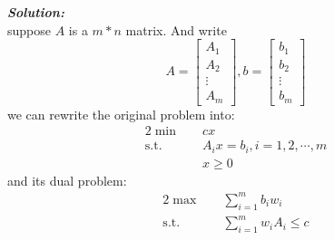 \documentclass[paper=a4, fontsize=11pt]{scrartcl} %
\numberwithin{equation}{section} %
\numberwithin{figure}{section} %
\numberwithin{table}{section} %
\begin{document}
\emph{\textbf{Solution:}}\\
suppose $A$ is a $m*n$ matrix. And write
\begin{equation}\nonumber
A=\begin{bmatrix}
   A_1\\
   A_2\\
   \vdots\\
   A_m
  \end{bmatrix},
b= \begin{bmatrix}
   b_1\\
   b_2\\
   \vdots\\
   b_m
  \end{bmatrix}
\end{equation}
we can rewrite the original problem into:
\begin{alignat}{2}          \nonumber
\min\quad & cx \\    \nonumber
\mbox{s.t.}\quad            \nonumber
& A_ix=b_i, i=1,2,\cdots,m\\        \nonumber
& x \geq 0
\end{alignat}
and its dual problem:
\begin{alignat}{2}          \nonumber
\max\quad & \sum\limits_{i=1}^m b_iw_i \\    \nonumber
\mbox{s.t.}\quad            \nonumber
& \sum\limits_{i=1}^m w_iA_i\leq c\\        \nonumber
\end{alignat}
\end{document}
